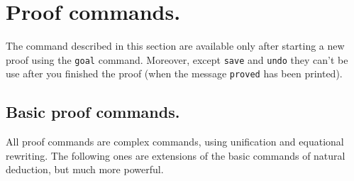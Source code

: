 

\section{Proof commands.}\label{proof-commands}

The command described in this section are available only after
starting a new proof using the {\tt goal} command. Moreover, except
{\tt save} and {\tt undo} they can't be use after you finished the
proof (when the message {\tt proved} has been printed).

\subsection{Basic proof commands.}
All proof commands are complex commands, using unification and
equational rewriting. The following ones are extensions of the basic
commands of natural deduction, but much more powerful.
